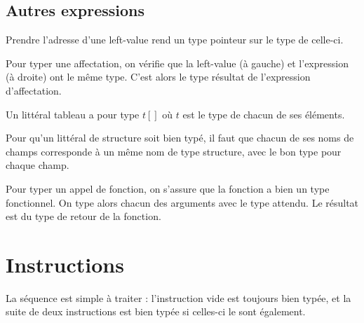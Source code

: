 \subsection*{Autres expressions}

Prendre l'adresse d'une left-value rend un type pointeur sur le type de
celle-ci.

\begin{mathpar}
\end{mathpar}

Pour typer une affectation, on vérifie que la left-value (à gauche) et
l'expression (à droite) ont le même type. C'est alors le type résultat de
l'expression d'affectation.

\begin{mathpar}
\end{mathpar}

Un littéral tableau a pour type $t[]$ où $t$ est le type de chacun de ses
éléments.

\begin{mathpar}
\end{mathpar}

Pour qu'un littéral de structure soit bien typé, il faut que chacun de ses noms
de champs corresponde à un même nom de type structure, avec le bon type pour
chaque champ.

\begin{mathpar}
\end{mathpar}

Pour typer un appel de fonction, on s'assure que la fonction a bien un type
fonctionnel. On type alors chacun des arguments avec le type attendu. Le
résultat est du type de retour de la fonction.

\begin{mathpar}
\end{mathpar}

\section{Instructions}

La séquence est simple à traiter : l'instruction vide est toujours bien typée,
et la suite de deux instructions est bien typée si celles-ci le sont également.

\begin{mathpar}

\end{mathpar}

